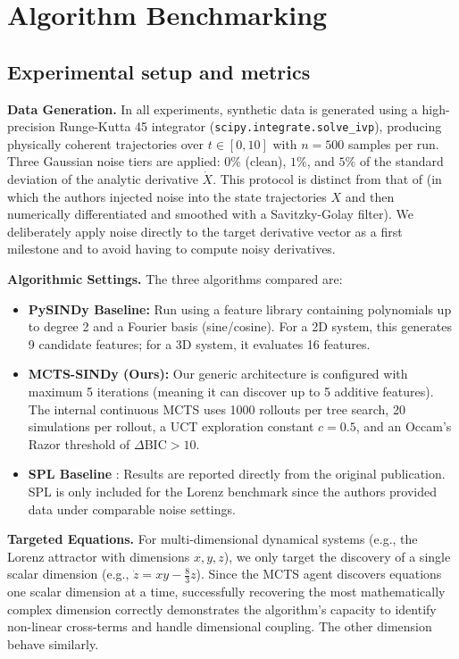 \documentclass[11pt, a4paper]{article}
\begin{document}
\section{Algorithm Benchmarking}
\label{sec:bench}
\subsection{Experimental setup and metrics}

\noindent \textbf{Data Generation.} In all experiments, synthetic data is generated using a high-precision Runge-Kutta 45 integrator (\texttt{scipy.integrate.solve\_ivp}), producing physically coherent trajectories over $t \in [0, 10]$ with $n = 500$ samples per run. Three Gaussian noise tiers are applied: $0\%$ (clean), $1\%$, and $5\%$ of the standard deviation of the analytic derivative $\dot{X}$. This protocol is distinct from that of \cite{sun2023spl} (in which the authors injected noise into the state trajectories $X$ and then numerically differentiated and smoothed with a Savitzky-Golay filter). We deliberately apply noise directly to the target derivative vector as a first milestone and to avoid having to compute noisy derivatives.

\vspace{0.3cm}
\noindent \textbf{Algorithmic Settings.} The three algorithms compared are:
\begin{itemize}
    \item \textbf{PySINDy Baseline:} Run using a feature library containing polynomials up to degree 2 and a Fourier basis (sine/cosine). For a 2D system, this generates 9 candidate features; for a 3D system, it evaluates 16 features.
    \item \textbf{MCTS-SINDy (Ours):} Our generic architecture is configured with maximum 5 iterations (meaning it can discover up to 5 additive features). The internal continuous MCTS uses 1000 rollouts per tree search, 20 simulations per rollout, a UCT exploration constant $c=0.5$, and an Occam's Razor threshold of $\Delta\text{BIC} > 10$.
    \item \textbf{SPL Baseline} \cite{sun2023spl}: Results are reported directly from the original publication. SPL is only included for the Lorenz benchmark since the authors provided data under comparable noise settings.
\end{itemize}

\vspace{0.3cm}
\noindent \textbf{Targeted Equations.} For multi-dimensional dynamical systems (e.g., the Lorenz attractor with dimensions $x, y, z$), we only target the discovery of a single scalar dimension (e.g., $\dot{z} = xy - \frac{8}{3}z$). Since the MCTS agent discovers equations one scalar dimension at a time, successfully recovering the most mathematically complex dimension correctly demonstrates the algorithm's capacity to identify non-linear cross-terms and handle dimensional coupling. The other dimension behave similarly.
\end{document}

